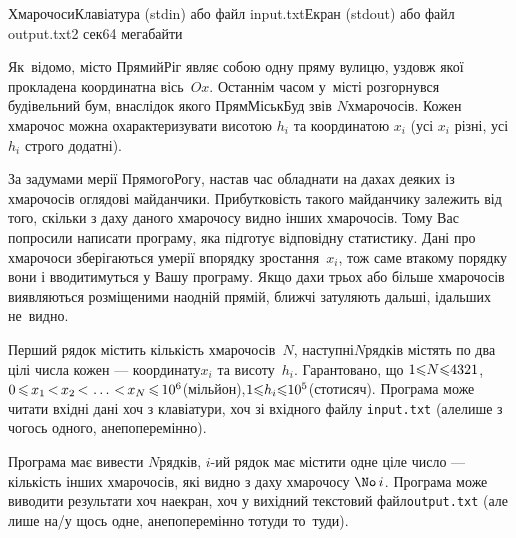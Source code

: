 \documentclass[14pt,a4paper]{extarticle}
\def\dib#1{\,#1\discretionary{}{\mbox{$#1$}}{}\,}
\begin{document}
\vspace{10mm}\par
\begin{problem}{Хмарочоси}{Клавіатура (stdin) або файл input.txt}{Екран (stdout) або файл output.txt}{2 сек}{64 мегабайти}

Як~відомо, місто Прямий\nolinebreak[2] Ріг являє собою одну пряму вулицю, уздовж якої прокладена координатна вісь~$Ox$. Останнім часом у~місті розгорнувся будівельний бум, внаслідок якого ПрямМіськБуд звів $N$\nolinebreak[3] хмарочосів. Кожен хмарочос можна охарактеризувати висотою $h_i$ та координатою $x_i$ (усі $x_i$ різні, усі $h_i$ строго додатні).

За задумами мерії Прямого\nolinebreak[2] Рогу, настав час обладнати на дахах деяких із хмарочосів оглядові майданчики. Прибутковість такого майданчику залежить від того, скільки з даху даного хмарочосу видно інших хмарочосів. Тому Вас попросили написати програму, яка підготує відповідну статистику. Дані про хмарочоси зберігаються у\nolinebreak[3] мерії в\nolinebreak[3] порядку зростання~$x_i$, тож саме в\nolinebreak[3] такому порядку вони і вводитимуться у Вашу програму. Якщо дахи трьох або більше хмарочосів виявляються розміщеними на\nolinebreak[2] одній прямій, ближчі затуляють дальші, і\nolinebreak[3] дальших не~видно.

\InputFile
Перший рядок містить кількість хмарочосів~$N$, наступні\nolinebreak[2] $N$\nolinebreak[3] рядків містять по два цілі числа кожен --- координату\nolinebreak[3] $x_i$ та висоту~$h_i$. Гарантовано, що ${1{\leqslant}N{\leqslant}4321}$, $0\dib{{\<}}x_1\dib{{<}}x_2\dib{{<}}\dots\dib{{<}}x_N\dib{{\<}}10^6$\nolinebreak[3] (мільйон),\linebreak[2] ${1{\leqslant}h_i{\leqslant}10^5}$\nolinebreak[2] (сто\nolinebreak[3] тисяч). Програма може читати вхідні дані хоч з клавіатури, хоч зі вхідного файлу \verb"input.txt" (але\nolinebreak[2] лише з чогось одного, а\nolinebreak[3] не\nolinebreak[2] поперемінно).

\OutputFile
Програма має вивести $N$\nolinebreak[3] рядків, $i$-ий рядок має містити одне ціле число --- кількість інших хмарочосів, які видно з даху хмарочосу $\No\,i$. Програма може виводити результати хоч на\nolinebreak[3] екран, хоч у вихідний текстовий файл\nolinebreak[2] \verb"output.txt" (але лише на/у щось одне, а\nolinebreak[3] не\nolinebreak[2] поперемінно то\nolinebreak[3] туди то~туди).

\begin{minipage}{\textwidth}

\Example


\end{minipage}
\end{problem}
\end{document}
